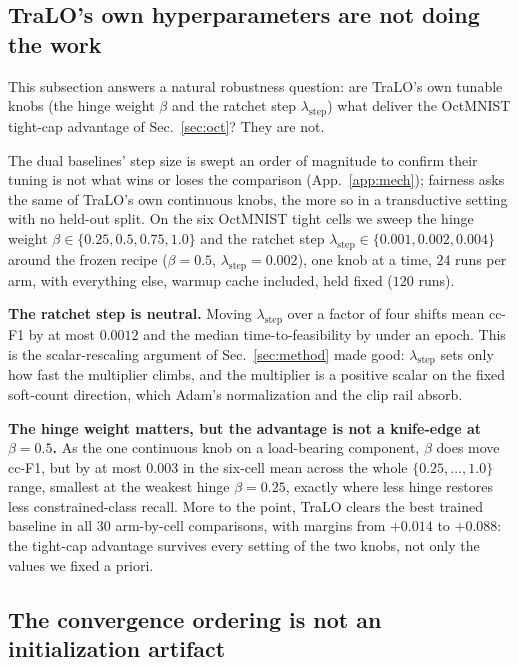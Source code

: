 \documentclass[10pt]{article}
\begin{document}
\subsection{TraLO's own hyperparameters are not doing the work}
\label{app:tralo-sweep}

This subsection answers a natural robustness question: are TraLO's own
tunable knobs (the hinge weight $\beta$ and the ratchet step
$\lambda_{\text{step}}$) what deliver the OctMNIST tight-cap advantage
of Sec.~\ref{sec:oct}? They are not.

The dual baselines' step size is swept an order of magnitude to confirm
their tuning is not what wins or loses the comparison
(App.~\ref{app:mech}); fairness asks the same of TraLO's own
continuous knobs, the more so in a transductive setting with no
held-out split. On the six OctMNIST tight cells we sweep the hinge
weight $\beta\in\{0.25,0.5,0.75,1.0\}$ and the ratchet step
$\lambda_{\text{step}}\in\{0.001,0.002,0.004\}$ around the frozen
recipe ($\beta{=}0.5$, $\lambda_{\text{step}}{=}0.002$), one knob at a
time, $24$ runs per arm, with everything else, warmup cache included,
held fixed ($120$ runs).

\textbf{The ratchet step is neutral.} Moving $\lambda_{\text{step}}$
over a factor of four shifts mean cc-F1 by at most $0.0012$ and the
median time-to-feasibility by under an epoch. This is the
scalar-rescaling argument of Sec.~\ref{sec:method} made good:
$\lambda_{\text{step}}$ sets only how fast the multiplier climbs, and
the multiplier is a positive scalar on the fixed soft-count direction,
which Adam's normalization and the clip rail absorb.

\textbf{The hinge weight matters, but the advantage is not a
knife-edge at $\beta{=}0.5$.} As the one continuous knob on a
load-bearing component, $\beta$ does move cc-F1, but by at most $0.003$
in the six-cell mean across the whole $\{0.25,\dots,1.0\}$ range,
smallest at the weakest hinge $\beta{=}0.25$, exactly where less hinge
restores less constrained-class recall. More to the point, TraLO
clears the best trained baseline in all $30$ arm-by-cell comparisons,
with margins from $+0.014$ to $+0.088$: the tight-cap advantage
survives every setting of the two knobs, not only the values we fixed
a priori.

\subsection{The convergence ordering is not an initialization artifact}
\label{app:init}
\end{document}
